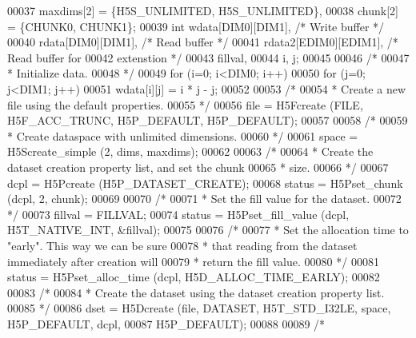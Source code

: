 \begin{DoxyCode}
00037                     maxdims[2] = \{H5S\_UNLIMITED, H5S\_UNLIMITED\},
00038                     chunk[2] = \{CHUNK0, CHUNK1\};
00039     \textcolor{keywordtype}{int}             wdata[DIM0][DIM1],          \textcolor{comment}{/* Write buffer */}
00040                     rdata[DIM0][DIM1],          \textcolor{comment}{/* Read buffer */}
00041                     rdata2[EDIM0][EDIM1],       \textcolor{comment}{/* Read buffer for}
00042 \textcolor{comment}{                                                   extenstion */}
00043                     fillval,
00044                     i, j;
00045 
00046     \textcolor{comment}{/*}
00047 \textcolor{comment}{     * Initialize data.}
00048 \textcolor{comment}{     */}
00049     \textcolor{keywordflow}{for} (i=0; i<DIM0; i++)
00050         \textcolor{keywordflow}{for} (j=0; j<DIM1; j++)
00051             wdata[i][j] = i * j - j;
00052 
00053     \textcolor{comment}{/*}
00054 \textcolor{comment}{     * Create a new file using the default properties.}
00055 \textcolor{comment}{     */}
00056     file = H5Fcreate (FILE, H5F\_ACC\_TRUNC, H5P\_DEFAULT, H5P\_DEFAULT);
00057 
00058     \textcolor{comment}{/*}
00059 \textcolor{comment}{     * Create dataspace with unlimited dimensions.}
00060 \textcolor{comment}{     */}
00061     space = H5Screate\_simple (2, dims, maxdims);
00062 
00063     \textcolor{comment}{/*}
00064 \textcolor{comment}{     * Create the dataset creation property list, and set the chunk}
00065 \textcolor{comment}{     * size.}
00066 \textcolor{comment}{     */}
00067     dcpl = H5Pcreate (H5P\_DATASET\_CREATE);
00068     status = H5Pset\_chunk (dcpl, 2, chunk);
00069 
00070     \textcolor{comment}{/*}
00071 \textcolor{comment}{     * Set the fill value for the dataset.}
00072 \textcolor{comment}{     */}
00073     fillval = FILLVAL;
00074     status = H5Pset\_fill\_value (dcpl, H5T\_NATIVE\_INT, &fillval);
00075 
00076     \textcolor{comment}{/*}
00077 \textcolor{comment}{     * Set the allocation time to "early".  This way we can be sure}
00078 \textcolor{comment}{     * that reading from the dataset immediately after creation will}
00079 \textcolor{comment}{     * return the fill value.}
00080 \textcolor{comment}{     */}
00081     status = H5Pset\_alloc\_time (dcpl, H5D\_ALLOC\_TIME\_EARLY);
00082 
00083     \textcolor{comment}{/*}
00084 \textcolor{comment}{     * Create the dataset using the dataset creation property list.}
00085 \textcolor{comment}{     */}
00086     dset = H5Dcreate (file, DATASET, H5T\_STD\_I32LE, space, H5P\_DEFAULT, dcpl,
00087                 H5P\_DEFAULT);
00088 
00089     \textcolor{comment}{/*}

\end{DoxyCode}
